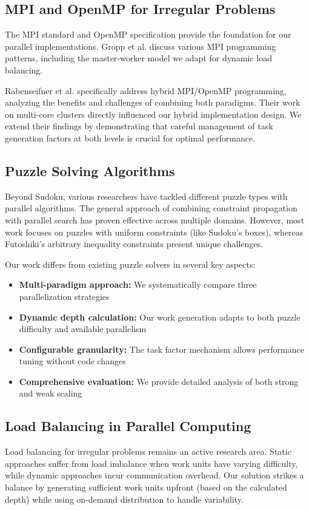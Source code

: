 \subsection{MPI and OpenMP for Irregular Problems}
The MPI standard \cite{MPIForum2021} and OpenMP specification \cite{OpenMP2020} provide the foundation for our parallel implementations. Gropp et al. \cite{Gropp1999} discuss various MPI programming patterns, including the master-worker model we adapt for dynamic load balancing.

Rabenseifner et al. \cite{Rabenseifner2009} specifically address hybrid MPI/OpenMP programming, analyzing the benefits and challenges of combining both paradigms. Their work on multi-core clusters directly influenced our hybrid implementation design. We extend their findings by demonstrating that careful management of task generation factors at both levels is crucial for optimal performance.

\subsection{Puzzle Solving Algorithms}
Beyond Sudoku, various researchers have tackled different puzzle types with parallel algorithms. The general approach of combining constraint propagation with parallel search has proven effective across multiple domains. However, most work focuses on puzzles with uniform constraints (like Sudoku's boxes), whereas Futoshiki's arbitrary inequality constraints present unique challenges.

Our work differs from existing puzzle solvers in several key aspects:
\begin{itemize}
    \item \textbf{Multi-paradigm approach:} We systematically compare three parallelization strategies
    \item \textbf{Dynamic depth calculation:} Our work generation adapts to both puzzle difficulty and available parallelism
    \item \textbf{Configurable granularity:} The task factor mechanism allows performance tuning without code changes
    \item \textbf{Comprehensive evaluation:} We provide detailed analysis of both strong and weak scaling
\end{itemize}

\subsection{Load Balancing in Parallel Computing}
Load balancing for irregular problems remains an active research area. Static approaches suffer from load imbalance when work units have varying difficulty, while dynamic approaches incur communication overhead. Our solution strikes a balance by generating sufficient work units upfront (based on the calculated depth) while using on-demand distribution to handle variability.

